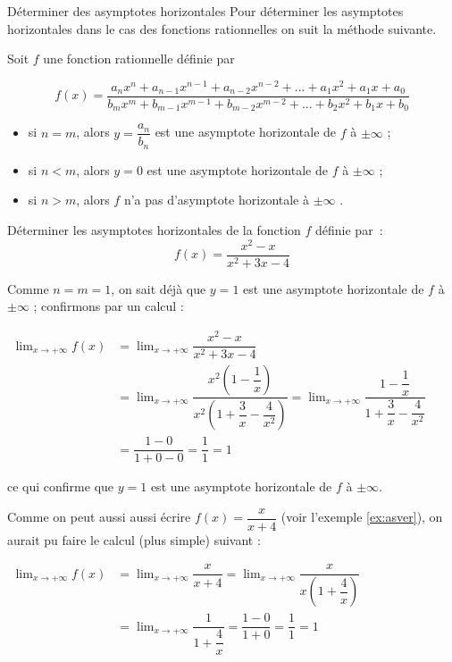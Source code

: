 \documentclass[a4paper,12pt]{article}
\begin{document}
\begin{methode}
Déterminer des asymptotes horizontales	
\tcblower
Pour déterminer les asymptotes horizontales dans le cas des fonctions rationnelles on suit la méthode suivante.

Soit $f$ une fonction rationnelle définie par

\[f(x) = \dfrac{a_n x^n + a_{n-1} x^{n-1} + a_{n-2} x^{n-2} + ... + a_1 x^2 + a_1 x + a_0}{b_m x^m + b_{m-1} x^{m-1} + b_{m-2} x^{m-2} + ... + b_2 x^2 + b_1 x + b_0}\]

\begin{itemize}
\item si $n = m$, alors $y = \dfrac{a_n}{b_n}$ est une asymptote horizontale de $f$ à $\pm\infty$ ;

\item si $n < m$, alors $y = 0$ est une asymptote horizontale de $f$ à $\pm\infty$ ;

\item si $n > m$, alors $f$ n'a pas d'asymptote horizontale à $\pm\infty$ .
\end{itemize}
\end{methode}

\begin{exemple}
	\tcblower
	Déterminer les asymptotes horizontales de la fonction $f$ définie par~:
\[f(x) = \dfrac{x^2 - x}{x^2 + 3x - 4}\]

Comme $n = m = 1$, on sait déjà que $y = 1$ est une asymptote horizontale de $f$ à $\pm\infty$ ; confirmons par un calcul :

$
\begin{aligned}
	\displaystyle\lim_{x \to +\infty} f(x) &= \lim_{x \to +\infty} \dfrac{x^2 - x}{x^2 + 3x - 4}\\
					&= \lim_{x \to +\infty} \dfrac{x^2\left(1 - \dfrac{1}{x}\right)}{x^2\left(1 + \dfrac{3}{x} - \dfrac{4}{x^2}\right)}= \lim_{x \to +\infty} \dfrac{1 - \dfrac{1}{x}}{1 + \dfrac{3}{x} - \dfrac{4}{x^2}}\\
					       &= \dfrac{1 - 0}{1 + 0 - 0}= \dfrac{1}{1} = 1
\end{aligned}$

ce qui confirme que $y = 1$ est une asymptote horizontale de $f$ à $\pm\infty$.

Comme on peut aussi aussi écrire $f(x) = \dfrac{x}{x + 4}$ (voir l'exemple \ref{ex:asver}), on aurait pu faire le calcul (plus simple) suivant :

$
\begin{aligned}
	\displaystyle\lim_{x \to +\infty} f(x) &= \lim_{x \to +\infty} \dfrac{x}{x + 4} = \lim_{x \to +\infty} \dfrac{x}{x\left(1 + \dfrac{4}{x}\right)}\\
&= \lim_{x \to +\infty} \dfrac{1}{1 + \dfrac{4}{x}} = \dfrac{1 - 0}{1 + 0}=\dfrac{1}{1} = 1
\end{aligned}$

\end{exemple}
\end{document}

